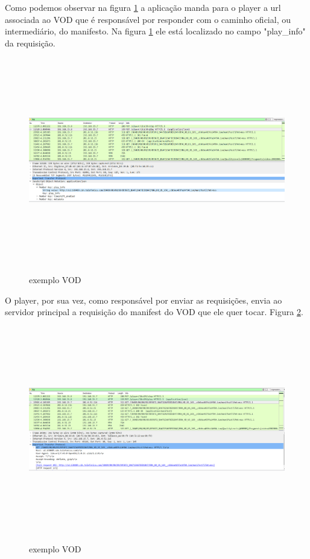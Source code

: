 Como podemos observar na figura \ref{figura:exemplo_vod_1} a aplica\c{c}\~ao manda para o player a url associada ao VOD que \'e respons\'avel por responder com o caminho oficial, ou intermedi\'ario, do manifesto. Na figura \ref{figura:exemplo_vod_1} ele est\'a localizado no campo "play\_info" da requisi\c{c}\~ao.
\begin{figure}[h]
\caption{exemplo VOD}
\includegraphics[height=9cm]{Figuras/exemplo_vod_1.png} 
\label{figura:exemplo_vod_1}
\end{figure}

O player, por sua vez, como respons\'avel por enviar as requisi\c{c}\~oes, envia ao servidor principal a requisi\c{c}\~ao do manifest do VOD que ele quer tocar. Figura \ref{figura:exemplo_vod_2}.
\begin{figure}[h]
\caption{exemplo VOD}
\includegraphics[height=9cm]{Figuras/exemplo_vod_2.png} 
\label{figura:exemplo_vod_2}
\end{figure}

